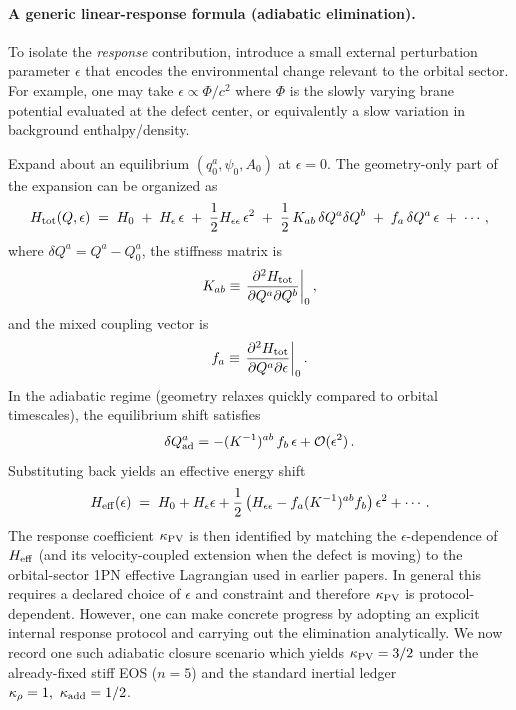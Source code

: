 \documentclass[11pt]{article}
\begin{document}
\paragraph{A generic linear-response formula (adiabatic elimination).}
To isolate the \emph{response} contribution, introduce a small external perturbation parameter
$\epsilon$ that encodes the environmental change relevant to the orbital sector. For example, one may
take $\epsilon\propto \Phi/c^2$ where $\Phi$ is the slowly varying brane potential evaluated at the
defect center, or equivalently a slow variation in background enthalpy/density.

Expand about an equilibrium $(q_0^a,\psi_0,A_0)$ at $\epsilon=0$. The geometry-only part of the expansion
can be organized as
\begin{equation}
  H_{\rm tot}(Q,\epsilon)
  \;=\;
  H_0
  \;+\;
  H_{\epsilon}\,\epsilon
  \;+\;
  \frac12 H_{\epsilon\epsilon}\,\epsilon^2
  \;+\;
  \frac12\,K_{ab}\,\delta Q^a\delta Q^b
  \;+\;
  f_a\,\delta Q^a\,\epsilon
  \;+\;\cdots,
  \label{eq:H_expand}
\end{equation}
where $\delta Q^a=Q^a-Q_0^a$, the stiffness matrix is
\begin{equation}
  K_{ab}\equiv \left.\frac{\partial^2 H_{\rm tot}}{\partial Q^a\partial Q^b}\right|_0,
\end{equation}
and the mixed coupling vector is
\begin{equation}
  f_a\equiv \left.\frac{\partial^2 H_{\rm tot}}{\partial Q^a\partial \epsilon}\right|_0.
\end{equation}
In the adiabatic regime (geometry relaxes quickly compared to orbital timescales), the equilibrium
shift satisfies
\begin{equation}
  \delta Q^a_{\rm ad} = -(K^{-1})^{ab}\,f_b\,\epsilon + \mathcal O(\epsilon^2)\,.
  \label{eq:dq_adiabatic}
\end{equation}
Substituting back yields an effective energy shift
\begin{equation}
  H_{\rm eff}(\epsilon)
  \;=\;
  H_0 + H_{\epsilon}\epsilon
  +\frac12\left(H_{\epsilon\epsilon}-f_a(K^{-1})^{ab}f_b\right)\epsilon^2
  +\cdots.
  \label{eq:Heff_adiabatic}
\end{equation}
The response coefficient \(\kappa_{\rm PV}\) is then identified by matching the \(\epsilon\)-dependence of
\(H_{\rm eff}\) (and its velocity-coupled extension when the defect is moving) to the orbital-sector 1PN
effective Lagrangian used in earlier papers. In general this requires a declared choice of \(\epsilon\) and
constraint and therefore \(\kappa_{\rm PV}\) is protocol-dependent. However, one can make concrete progress
by adopting an explicit internal response protocol and carrying out the elimination analytically. We now
record one such adiabatic closure scenario which yields \(\kappa_{\rm PV}=3/2\) under the already-fixed
stiff EOS (\(n=5\)) and the standard inertial ledger \(\kappa_\rho=1,\ \kappa_{\rm add}=1/2\).
\end{document}
